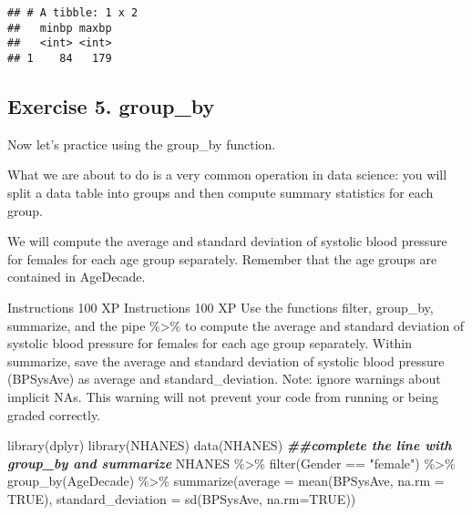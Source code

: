 \documentclass[
]{article}
\newenvironment{Shaded}{\begin{snugshade}}{\end{snugshade}}
\newcommand{\AttributeTok}[1]{\textcolor[rgb]{0.77,0.63,0.00}{#1}}
\newcommand{\ConstantTok}[1]{\textcolor[rgb]{0.00,0.00,0.00}{#1}}
\newcommand{\DocumentationTok}[1]{\textcolor[rgb]{0.56,0.35,0.01}{\textbf{\textit{#1}}}}
\newcommand{\FunctionTok}[1]{\textcolor[rgb]{0.00,0.00,0.00}{#1}}
\newcommand{\NormalTok}[1]{#1}
\newcommand{\SpecialCharTok}[1]{\textcolor[rgb]{0.00,0.00,0.00}{#1}}
\newcommand{\StringTok}[1]{\textcolor[rgb]{0.31,0.60,0.02}{#1}}
\begin{document}
\begin{verbatim}
## # A tibble: 1 x 2
##   minbp maxbp
##   <int> <int>
## 1    84   179
\end{verbatim}

\hypertarget{exercise-5.-group_by}{%
\subsection{Exercise 5. group\_by}\label{exercise-5.-group_by}}

Now let's practice using the group\_by function.

What we are about to do is a very common operation in data science: you
will split a data table into groups and then compute summary statistics
for each group.

We will compute the average and standard deviation of systolic blood
pressure for females for each age group separately. Remember that the
age groups are contained in AgeDecade.

Instructions 100 XP Instructions 100 XP Use the functions filter,
group\_by, summarize, and the pipe \%\textgreater\% to compute the
average and standard deviation of systolic blood pressure for females
for each age group separately. Within summarize, save the average and
standard deviation of systolic blood pressure (BPSysAve) as average and
standard\_deviation. Note: ignore warnings about implicit NAs. This
warning will not prevent your code from running or being graded
correctly.

\begin{Shaded}
\begin{Highlighting}[]
\FunctionTok{library}\NormalTok{(dplyr)}
\FunctionTok{library}\NormalTok{(NHANES)}
\FunctionTok{data}\NormalTok{(NHANES)}
\DocumentationTok{\#\#complete the line with group\_by and summarize}
\NormalTok{NHANES }\SpecialCharTok{\%\textgreater{}\%}
      \FunctionTok{filter}\NormalTok{(Gender }\SpecialCharTok{==} \StringTok{"female"}\NormalTok{) }\SpecialCharTok{\%\textgreater{}\%}
      \FunctionTok{group\_by}\NormalTok{(AgeDecade) }\SpecialCharTok{\%\textgreater{}\%}
      \FunctionTok{summarize}\NormalTok{(}\AttributeTok{average =} \FunctionTok{mean}\NormalTok{(BPSysAve, }\AttributeTok{na.rm =} \ConstantTok{TRUE}\NormalTok{), }
            \AttributeTok{standard\_deviation =} \FunctionTok{sd}\NormalTok{(BPSysAve, }\AttributeTok{na.rm=}\ConstantTok{TRUE}\NormalTok{))}
\end{Highlighting}
\end{Shaded}
\end{document}
